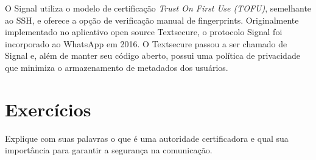 O Signal utiliza o modelo de certificação \textit{Trust On First Use (TOFU)}, semelhante ao SSH, e oferece a opção de verificação manual de fingerprints.
Originalmente implementado no aplicativo open source Textsecure, o protocolo Signal foi incorporado ao WhatsApp em 2016.
O Textsecure passou a ser chamado de Signal e, além de manter seu código aberto, possui uma política de privacidade que minimiza o armazenamento de metadados dos usuários.

\section{Exercícios}


\begin{exercicio}
  Explique com suas palavras o que é uma autoridade certificadora e qual sua importância para garantir a segurança na comunicação.
\end{exercicio}
